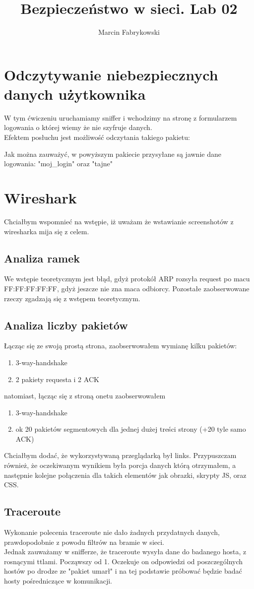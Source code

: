 \documentclass[a4paper,12pt]{article}
\author{Marcin Fabrykowski}
\title{Bezpieczeństwo w sieci. Lab 02}
\date{}
\begin{document}
\maketitle
\newpage
\section{Odczytywanie niebezpiecznych danych użytkownika}
W tym ćwiczeniu uruchamiamy sniffer i wchodzimy na stronę z formularzem logowania o której wiemy że nie szyfruje danych.\\
Efektem posłuchu jest możliwość odczytania takiego pakietu:
\footnotesize

\normalsize
Jak można zauważyć, w powyższym pakiecie przysyłane są jawnie dane logowania: "moj\_login" oraz "tajne"
\section{Wireshark}
Chciałbym wspomnieć na wstępie, iż uważam że wstawianie screenshotów z wiresharka mija się z celem.\\
\subsection{Analiza ramek}
We wstępie teoretycznym jest błąd, gdyż protokół ARP rozsyła request po macu FF:FF:FF:FF:FF, gdyż jeszcze nie zna maca odbiorcy. Pozostałe zaobserwowane rzeczy zgadzają się z wstępem teoretycznym.
\subsection{Analiza liczby pakietów}
Łącząc się ze swoją prostą strona, zaobserwowałem wymianę kilku pakietów:
\begin{enumerate}
\item 3-way-handshake
\item 2 pakiety requesta i 2 ACK
\end{enumerate}
natomiast, łącząc się z stroną onetu zaobserwowałem
\begin{enumerate}
\item 3-way-handshake
\item ok 20 pakietów segmentowych dla jednej dużej treści strony (+20 tyle samo ACK)
\end{enumerate}
Chciałbym dodać, że wykorzystywaną przeglądarką był links. Przypuszczam również, że oczekiwanym wynikiem była porcja danych którą otrzymałem, a następnie kolejne połączenia dla takich elementów jak obrazki, skrypty JS, oraz CSS.
\subsection{Traceroute}
Wykonanie polecenia traceroute nie dało żadnych przydatnych danych, prawdopodobnie z powodu filtrów na bramie w sieci.\\
Jednak zauważamy w snifferze, że traceroute wysyła dane do badanego hosta, z rosnącymi ttlami. Począwszy od 1. Oczekuje on odpowiedzi od poszczególnych hostów po drodze ze "pakiet umarł" i na tej podstawie próbować będzie badać hosty pośredniczące w komunikacji.
\end{document}
